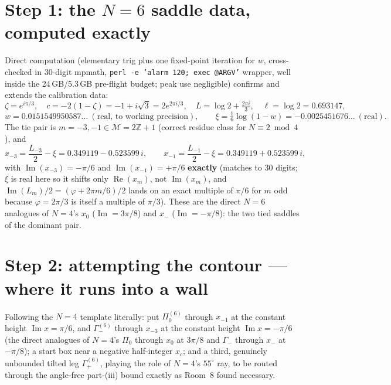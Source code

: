 \documentclass[11pt]{article}
\begin{document}
\section*{Step 1: the $N=6$ saddle data, computed exactly}

Direct computation (elementary trig plus one fixed-point iteration for $w$, cross-checked in
30-digit mpmath, \texttt{perl -e 'alarm 120; exec @ARGV'} wrapper, well inside the 24\,GB/5.3\,GB
pre-flight budget; peak use negligible) confirms and extends the calibration data:
\[
   \zeta=e^{i\pi/3},\quad c=-2(1-\zeta)=-1+i\sqrt3=2e^{2\pi i/3},\quad
   L=\log2+\tfrac{2\pi i}3,\quad \ell=\log2=0.693147,
\]
\[
   w=0.0151549950587\ldots\ (\text{real, to working precision}),\qquad
   \xi=\tfrac16\log(1-w)=-0.0025451676\ldots\ (\text{real}).
\]
The tie pair is $m=-3,-1\in\mathcal M=2\mathbb Z+1$ (correct residue class for $N\equiv2\bmod4$), and
\[
   x_{-3}=\frac{L_{-3}}2-\xi=0.349119-0.523599\,i,\qquad
   x_{-1}=\frac{L_{-1}}2-\xi=0.349119+0.523599\,i,
\]
with $\operatorname{Im}(x_{-3})=-\pi/6$ and $\operatorname{Im}(x_{-1})=+\pi/6$ \textbf{exactly}
(matches to $30$ digits; $\xi$ is real here so it shifts only $\operatorname{Re}(x_m)$, not
$\operatorname{Im}(x_m)$, and $\operatorname{Im}(L_m)/2=(\varphi+2\pi m/6)/2$ lands on an exact
multiple of $\pi/6$ for $m$ odd because $\varphi=2\pi/3$ is itself a multiple of $\pi/3$). These are
the direct $N=6$ analogues of $N=4$'s $x_0$ ($\operatorname{Im}=3\pi/8$) and $x_-$
($\operatorname{Im}=-\pi/8$): the two tied saddles of the dominant pair.

\section*{Step 2: attempting the contour --- where it runs into a wall}

Following the $N=4$ template literally: put $\Pi_0^{(6)}$ through $x_{-1}$ at the constant height
$\operatorname{Im}x=\pi/6$, and $\Gamma_-^{(6)}$ through $x_{-3}$ at the constant height
$\operatorname{Im}x=-\pi/6$ (the direct analogues of $N=4$'s $\Pi_0$ through $x_0$ at $3\pi/8$ and
$\Gamma_-$ through $x_-$ at $-\pi/8$); a start box near a negative half-integer $x_c$; and a third,
genuinely unbounded tilted leg $\Gamma_+^{(6)}$, playing the role of $N=4$'s $55^\circ$ ray, to be
routed through the angle-free part-(iii) bound exactly as Room~8 found necessary.
\end{document}
